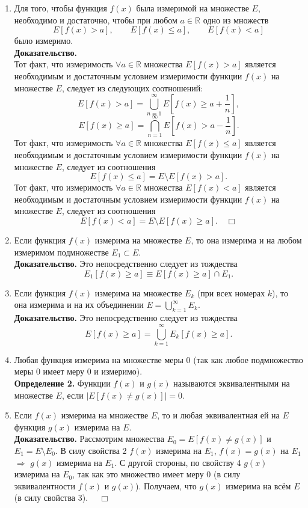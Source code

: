 \documentclass[12pt,a4paper, titlepage]{article}
\begin{document}
\begin{enumerate}
\item Для того, чтобы функция $f(x)$ была измеримой на множестве $E$, необходимо и достаточно, чтобы при любом $a \in \mathbb R$ одно из множеств
$$
E [f(x) > a], \qquad E [f(x) \leqslant a], \qquad E [f(x) < a]
$$
было измеримо.\\
\textbf{Доказательство.}\\
Тот факт, что измеримость $\forall a \in \mathbb R$ множества $E[f(x) > a]$ является необходимым и достаточным условием измеримости функции $f(x)$ на множестве $E$, следует из следующих соотношений:
$$
E[f(x) > a] = \bigcup_{n=1}^\infty E[f(x) \geqslant a + \frac 1 n],
$$
$$
E[f(x) \geqslant a] = \bigcap_{n=1}^\infty E[f(x) > a - \frac 1 n].
$$
Тот факт, что измеримость $\forall a \in \mathbb R$ множества $E[f(x) \leqslant a]$ является необходимым и достаточным условием измеримости функции $f(x)$ на множестве $E$, следует из соотношения
$$
E [f(x) \leqslant a] = E \setminus E[f(x) > a].
$$
Тот факт, что измеримость $\forall a \in \mathbb R$ множества $E[f(x) < a]$ является необходимым и достаточным условием измеримости функции $f(x)$ на множестве $E$, следует из соотношения
$$
E [f(x) < a ] = E \setminus E [f(x) \geqslant a]. \quad \Box
$$

\item Если функция $f(x)$ измерима на множестве $E$, то она измерима и на любом измеримом подмножестве $E_1 \subset E$.\\
\textbf{Доказательство.}
Это непосредственно следует из тождества
$$
E_1[f(x) \geqslant a] \equiv E [f(x) \geqslant a] \cap E_1.
$$

\item Если функция $f(x)$ измерима на множестве $E_k$ (при всех номерах $k$), то она измерима и на их объединении $E = \bigcup\limits_{k=1}^\infty E_k$.\\
\textbf{Доказательство.}
Это непосредственно следует из тождества
$$
E[f(x) \geqslant a] = \bigcup_{k=1}^\infty E_k[f(x) \geqslant a].
$$

\item Любая функция измерима на множестве меры 0 (так как любое подмножество меры 0 имеет меру 0 и измеримо).\\

\textbf{Определение 2.} Функции $f(x)$ и $g(x)$ называются эквивалентными на множестве $E$, если $|E[f(x) \neq g(x)]| = 0$.

\item Если $f(x)$ измерима на множестве $E$, то и любая эквивалентная ей на $E$ функция $g(x)$ измерима на $E$.\\
\textbf{Доказательство.}
Рассмотрим множества $E_0 = E[f(x) \neq g(x)]$ и $E_1 = E \setminus E_0$. В силу свойства 2 $f(x)$ измерима на $E_1$, $f(x) = g(x)$ на $E_1$ $\Rightarrow$ $g(x)$ измерима на $E_1$. С другой стороны, по свойству 4 $g(x)$ измерима на $E_0$, так как это множество имеет меру 0 (в силу эквивалентности $f(x)$ и $g(x)$). Получаем, что $g(x)$ измерима на всём $E$ (в силу свойства 3). $\quad \Box$\\


\end{enumerate}
\end{document}
